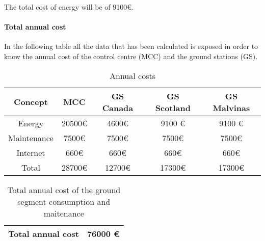 The total cost of energy will be of 9100\euro. 

\paragraph{Total annual cost}
In the following table all the data that has been calculated is exposed in order to know the annual cost of the control centre (MCC) and the ground stations (GS).
\begin{table}[H]
\begin{center}
\begin{tabular}{|c|c|c|c|c|}
\hline
\textbf{Concept}&\textbf{MCC}&\textbf{GS Canada}&\textbf{GS Scotland}&\textbf{GS Malvinas}\\
\hline
Energy&20500\euro &4600\euro &9100 \euro &9100 \euro\\
\hline
Maintenance&7500\euro &7500\euro &7500\euro &7500\euro \\
\hline
Internet&660\euro &660\euro &660\euro &660\euro\\
\hline
Total&28700\euro &12700\euro &17300\euro &17300\euro \\
\hline
\end{tabular}
\caption{Annual costs}
\end{center}
\end{table}
\begin{table}[H]
\begin{center}
\begin{tabular}{|c|c|}
\hline
\textbf{Total annual cost}&\textbf{76000 \euro}\\
\hline
\end{tabular}
\caption{Total annual cost of the ground segment consumption and maitenance}
\end{center}
\end{table}